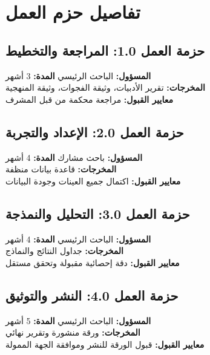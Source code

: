 \documentclass[11pt,a4paper]{article}
\begin{document}
\section{تفاصيل حزم العمل}
\label{sec:work_packages}

\subsection{حزمة العمل 1.0: المراجعة والتخطيط}
\textbf{المسؤول:} الباحث الرئيسي \quad \textbf{المدة:} 3 أشهر\\
\textbf{المخرجات:} تقرير الأدبيات، وثيقة الفجوات، وثيقة المنهجية\\
\textbf{معايير القبول:} مراجعة محكمة من قبل المشرف

\subsection{حزمة العمل 2.0: الإعداد والتجربة}
\textbf{المسؤول:} باحث مشارك \quad \textbf{المدة:} 4 أشهر\\
\textbf{المخرجات:} قاعدة بيانات منظفة\\
\textbf{معايير القبول:} اكتمال جميع العينات وجودة البيانات

\subsection{حزمة العمل 3.0: التحليل والنمذجة}
\textbf{المسؤول:} الباحث الرئيسي \quad \textbf{المدة:} 4 أشهر\\
\textbf{المخرجات:} جداول النتائج والنماذج\\
\textbf{معايير القبول:} دقة إحصائية مقبولة وتحقق مستقل

\subsection{حزمة العمل 4.0: النشر والتوثيق}
\textbf{المسؤول:} الباحث الرئيسي \quad \textbf{المدة:} 5 أشهر\\
\textbf{المخرجات:} ورقة منشورة وتقرير نهائي\\
\textbf{معايير القبول:} قبول الورقة للنشر وموافقة الجهة الممولة
\end{document}
